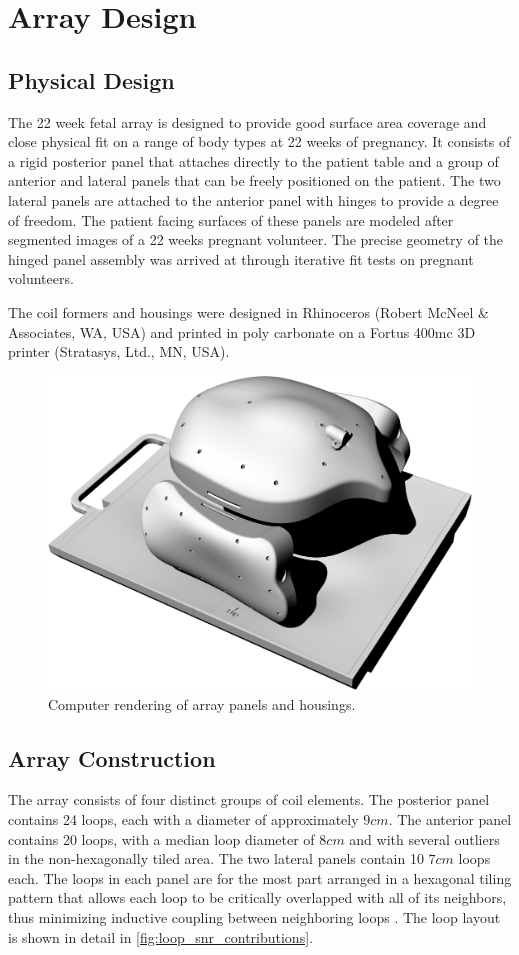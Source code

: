 \chapter{Array Design}
\section{Physical Design}
The 22 week fetal array is designed to provide good surface area coverage and close physical fit on a range of body
types at 22 weeks of pregnancy.  It consists of a rigid posterior panel that attaches directly to the patient table and
a group of anterior and lateral panels that can be freely positioned on the patient. The two lateral panels are attached
to the anterior panel with hinges to provide a degree of freedom. The patient facing surfaces of these panels are
modeled after segmented images of a 22 weeks pregnant volunteer. The precise geometry of the hinged panel assembly was
arrived at through iterative fit tests on pregnant volunteers.
 
The coil formers and housings were designed in Rhinoceros (Robert McNeel \& Associates, WA, USA) and printed in
poly carbonate on a Fortus 400mc 3D printer (Stratasys, Ltd., MN, USA).

\begin{figure}
\includegraphics[width=6in]{figures/cad_rendering.png}
\caption{Computer rendering of array panels and housings.}
\label{fig:cad_rendering}
\end{figure}

\section{Array Construction}
The array consists of four distinct groups of coil elements. The posterior panel contains 24 loops, each with a diameter
of approximately $9cm$. The anterior panel contains 20 loops, with a median loop diameter of $8cm$ and with several outliers
in the non-hexagonally tiled area. The two lateral panels contain 10 $7cm$ loops each. The loops in each panel are for
the most part arranged in a hexagonal tiling pattern that allows each loop to be critically overlapped with all of its
neighbors,  thus minimizing inductive coupling between neighboring loops \cite{Roemer90}. The loop layout is shown in
detail in \ref{fig:loop_snr_contributions}.

